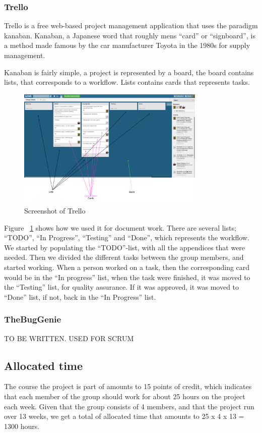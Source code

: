 \documentclass[11pt]{book}
\begin{document}
\subsubsection{Trello}
Trello is a free web-based project management application that uses the paradigm kanaban. Kanaban, a Japanese word that roughly mens “card” or “signboard”, is a method made famous by the car manufacturer Toyota in the 1980s for supply management. 

Kanaban is fairly simple, a project is represented by a board, the board contains lists, that corresponds to a workflow. Lists contains cards that represents tasks.

\begin{figure}[H]
      \centering
      \includegraphics[width=0.8\textwidth]{Figures/trello.png}
      \caption{Screenshot of Trello}
      \label{fig:tools_trello}
\end{figure}

Figure ~\ref{fig:tools_trello} shows how we used it for document work. There are several lists; “TODO”, “In Progress”, “Testing” and “Done”, which represents the workflow. We started by populating the “TODO”-list, with all the appendices that were needed. Then we divided the different tasks between the group members, and started working. When a person worked on a task, then the corresponding card would be in the “In progress” list, when the task were finished, it was moved to the “Testing” list, for quality assurance. If it was approved, it was moved to “Done” list, if not, back in the “In Progress” list.

\subsubsection{TheBugGenie}
TO BE WRITTEN. USED FOR SCRUM

\subsection{Allocated time}
The course the project is part of amounts to 15 points of credit, which indicates that each member of the group should work for about 25 hours on the project each week. Given that the group consists of 4 members, and that the project run over 13 weeks, we get a total of allocated time that amounts to 25 x 4 x 13 = 1300 hours.
\end{document}
